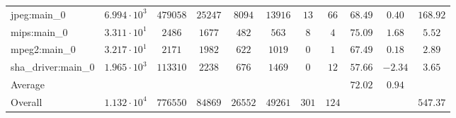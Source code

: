 \begin{tabular}{|l|c|c|c|c|c|c|c|c|c|c|}
jpeg:main\_0            & $ 6.994 \cdot 10^{3} $ & $ 479058 $ & $ 25247 $ & $ 8094  $ & $ 13916 $ & $ 13  $ & $ 66  $ & $ 68.49       $ & $ 0.40    $ & $ 168.92  $ \\
mips:main\_0            & $ 3.311 \cdot 10^{1} $ & $ 2486   $ & $ 1677  $ & $ 482   $ & $ 563   $ & $ 8   $ & $ 4   $ & $ 75.09       $ & $ 1.68    $ & $ 5.52    $ \\
mpeg2:main\_0           & $ 3.217 \cdot 10^{1} $ & $ 2171   $ & $ 1982  $ & $ 622   $ & $ 1019  $ & $ 0   $ & $ 1   $ & $ 67.49       $ & $ 0.18    $ & $ 2.89    $ \\
sha\_driver:main\_0     & $ 1.965 \cdot 10^{3} $ & $ 113310 $ & $ 2238  $ & $ 676   $ & $ 1469  $ & $ 0   $ & $ 12  $ & $ 57.66       $ & $ -2.34   $ & $ 3.65    $ \\
\hline
Average                 & $                    $ & $        $ & $       $ & $       $ & $       $ & $     $ & $     $ & $ 72.02       $ & $ 0.94    $ & $         $ \\
\hline
Overall                 & $ 1.132 \cdot 10^{4} $ & $ 776550 $ & $ 84869 $ & $ 26552 $ & $ 49261 $ & $ 301 $ & $ 124 $ & $             $ & $         $ & $ 547.37  $ \\
\hline
\end{tabular}
